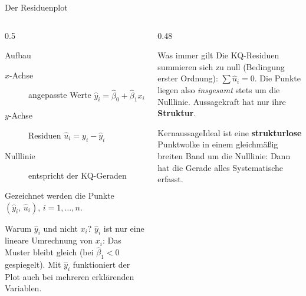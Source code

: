 \documentclass[aspectratio=169,11pt]{beamer}
\newcommand{\kernaussage}[1]{\begin{alertblock}{Kernaussage}#1\end{alertblock}}
\begin{document}
\begin{frame}{Der Residuenplot}
  \begin{columns}[T]
    \begin{column}{0.5\textwidth}
      \small
      \begin{block}{Aufbau}
        \begin{description}
          \item[$x$-Achse] angepasste Werte $\hat{y}_i = \hat{\beta}_0 + \hat{\beta}_1 x_i$
          \item[$y$-Achse] Residuen $\hat{u}_i = y_i - \hat{y}_i$
          \item[Nulllinie] entspricht der KQ-Geraden
        \end{description}
        Gezeichnet werden die Punkte $(\hat{y}_i,\,\hat{u}_i)$, $i = 1,\ldots,n$.
      \end{block}
      \begin{block}{Warum $\hat{y}_i$ und nicht $x_i$?}
        $\hat{y}_i$ ist nur eine lineare Umrechnung von $x_i$: Das Muster bleibt
        gleich (bei $\hat{\beta}_1 < 0$ gespiegelt). Mit $\hat{y}_i$ funktioniert
        der Plot auch bei mehreren erklärenden Variablen.
      \end{block}
    \end{column}
    \begin{column}{0.48\textwidth}
      \small
      \begin{exampleblock}{Was immer gilt}
        Die KQ-Residuen summieren sich zu null (Bedingung erster Ordnung):
        $\sum \hat{u}_i = 0$. Die Punkte liegen also \emph{insgesamt} stets um die
        Nulllinie. Aussagekraft hat nur ihre \textbf{Struktur}.
      \end{exampleblock}
      \kernaussage{Ideal ist eine \textbf{strukturlose} Punktwolke in einem
        gleichmäßig breiten Band um die Nulllinie: Dann hat die Gerade alles
        Systematische erfasst.}
    \end{column}
  \end{columns}
\end{frame}
\end{document}
